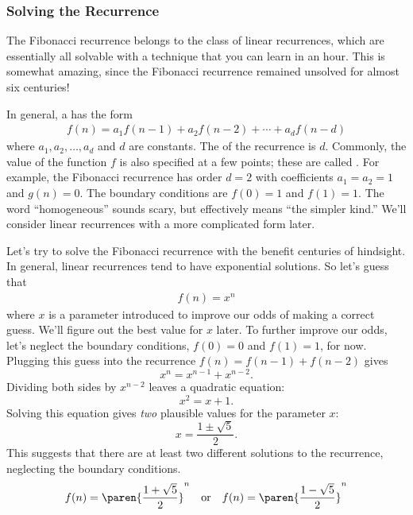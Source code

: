 \subsubsection{Solving the Recurrence}

The Fibonacci recurrence belongs to the class of linear recurrences,
which are essentially all solvable with a technique that you can learn
in an hour.  This is somewhat amazing, since the Fibonacci recurrence
remained unsolved for almost six centuries!

In general, a  has the form
\begin{align*}
f(n) = a_1 f(n-1) + a_2 f(n-2) + \cdots + a_d f(n - d)
\end{align*}
where $a_1, a_2, \dots, a_d$ and $d$ are constants.  The 
of the recurrence is $d$.  Commonly, the value of the function $f$ is
also specified at a few points; these are called .  For example, the Fibonacci recurrence has order $d =
2$ with coefficients $a_1 = a_2 = 1$ and $g(n) = 0$.  The boundary
conditions are $f(0) = 1$ and $f(1) = 1$.  The word ``homogeneous''
sounds scary, but effectively means ``the simpler kind.''  We'll
consider linear recurrences with a more complicated form later.

Let's try to solve the Fibonacci recurrence with the benefit centuries
of hindsight.  In general, linear recurrences tend to have exponential
solutions.  So let's guess that
\begin{align*}
  f(n) = x^n
\end{align*}
where $x$ is a parameter introduced to improve our odds of making a
correct guess.  We'll figure out the best value for $x$ later.  To
further improve our odds, let's neglect the boundary conditions, $f(0)
= 0$ and $f(1) = 1$, for now.  Plugging this guess into the recurrence
$f(n) = f(n - 1) + f(n - 2)$ gives
\[
x^n  = x^{n-1} + x^{n-2}.
\]
Dividing both sides by $x^{n-2}$ leaves a quadratic equation:
\[
x^2 = x + 1.
\]
Solving this equation gives \emph{two} plausible values for the
parameter $x$:
\[
x = \frac{1 \pm \sqrt{5}}{2}.
\]
This suggests that there are at least two different solutions to the
recurrence, neglecting the boundary conditions.
\[
  f(n) = \paren{\frac{1 + \sqrt{5}}{2}}^n \quad \text{or}\quad
  f(n) = \paren{\frac{1 - \sqrt{5}}{2}}^n
\]

